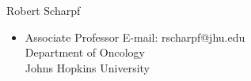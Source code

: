 \documentclass[10pt]{article}
\renewcommand{\section}[1]{\pagebreak[3]%
    \hyphenpenalty=10000%
    \vspace{1.3\baselineskip}%
    \phantomsection\addcontentsline{toc}{section}{#1}%
    \noindent\llap{\scshape\smash{\parbox[t]{\marginparwidth}{\raggedright #1}}}%
    \vspace{-\baselineskip}\par}
\newenvironment{innerlist}[1][\enskip\textbullet]%
        {\begin{itemize}[#1,leftmargin=*,parsep=0pt,itemsep=0pt,topsep=0pt,partopsep=0pt]}
        {\end{itemize}}
\newcommand{\halfblankline}{\quad\vspace{-0.5\baselineskip}\pagebreak[3]}
\begin{document}
\halfblankline

Robert Scharpf
\begin{innerlist}
\item[] Associate Professor \hfill{E-mail: rscharpf@jhu.edu}\\
Department of Oncology\\
Johns Hopkins University
\end{innerlist}


\begin{comment}
Computer Programming:
%
\begin{innerlist}
    \item R, UNIX shell scripting (including POSIX.2)
\end{innerlist}

\halfblankline
\end{comment}
\end{document}

